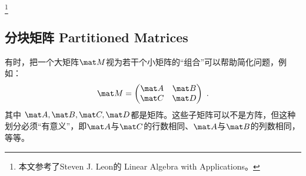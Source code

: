 
\begin{issues}
\issueDraft
\end{issues}
\footnote{本文参考了Steven J. Leon的 Linear Algebra with Applications。}

\subsection{分块矩阵 Partitioned Matrices}

有时，把一个大矩阵$\mat M$视为若干个小矩阵的“组合”可以帮助简化问题，例如：
\begin{equation}
\mat M = 
\begin{pmatrix}
\mat A & \mat B\\
\mat C & \mat D\\
\end{pmatrix}~.
\end{equation}
其中 $\mat A, \mat B, \mat C, \mat D$都是矩阵。这些子矩阵可以不是方阵，但这种划分必须“有意义”，即$\mat A$与$\mat C$的行数相同、$\mat A$与$\mat B$的列数相同，等等。

